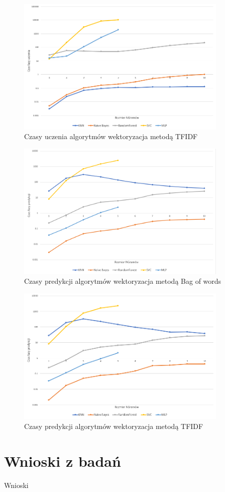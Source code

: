 \begin{figure}[h!]
    \centering
    \includegraphics[width=0.9\textwidth]{./Img/TFIDFLearn.png}
    \caption{Czasy uczenia algorytmów wektoryzacja metodą TFIDF}
\end{figure}

\begin{figure}[h!]
    \centering
    \includegraphics[width=0.9\textwidth]{./Img/BOWPredict.png}
    \caption{Czasy predykcji algorytmów wektoryzacja metodą Bag of words}
\end{figure}

\begin{figure}[h!]
    \centering
    \includegraphics[width=0.9\textwidth]{./Img/TFIDFPredict.png}
    \caption{Czasy predykcji algorytmów wektoryzacja metodą TFIDF}
\end{figure}

\section{Wnioski z badań}
Wnioski
